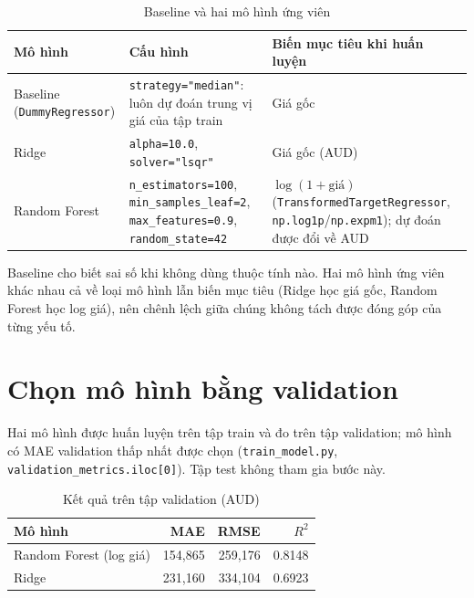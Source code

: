 \begin{table}[H]
\centering
\caption{Baseline và hai mô hình ứng viên}\label{tab:cacmohinh}
\small
\begin{tabular}{@{}l L{5.6cm} L{4.8cm}@{}}
\toprule
Mô hình & Cấu hình & Biến mục tiêu khi huấn luyện \\
\midrule
Baseline (\texttt{DummyRegressor}) & \texttt{strategy="median"}: luôn dự đoán trung vị giá của tập train & Giá gốc \\
Ridge & \texttt{alpha=10.0}, \texttt{solver="lsqr"} & Giá gốc (AUD) \\
Random Forest & \texttt{n\_estimators=100}, \texttt{min\_samples\_leaf=2}, \texttt{max\_features=0.9}, \texttt{random\_state=42} & $\log(1+\text{giá})$ (\texttt{Transformed}\allowbreak\texttt{TargetRegressor}, \texttt{np.log1p}/\texttt{np.expm1}); dự đoán được đổi về AUD \\
\bottomrule
\end{tabular}
\end{table}

Baseline cho biết sai số khi không dùng thuộc tính nào. Hai mô hình ứng viên khác nhau cả về loại mô hình lẫn biến mục tiêu (Ridge học giá gốc, Random Forest học log giá), nên chênh lệch giữa chúng không tách được đóng góp của từng yếu tố.

\section{Chọn mô hình bằng validation}\label{sec:chonmohinh}
Hai mô hình được huấn luyện trên tập train và đo trên tập validation; mô hình có MAE validation thấp nhất được chọn (\texttt{train\_model.py}, \texttt{validation\_metrics.iloc[0]}). Tập test không tham gia bước này.

\begin{table}[H]
\centering
\caption{Kết quả trên tập validation (AUD)}\label{tab:validation}
\small
\begin{tabular}{@{}l r r r@{}}
\toprule
Mô hình & MAE & RMSE & $R^2$ \\
\midrule
Random Forest (log giá) & 154,865 & 259,176 & 0.8148 \\
Ridge & 231,160 & 334,104 & 0.6923 \\
\bottomrule
\end{tabular}
\end{table}

